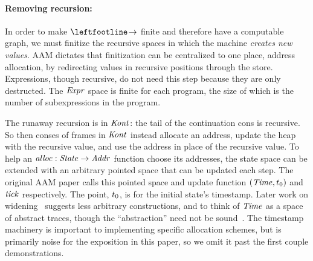 \paragraph{Removing recursion:}
In order to make $\stepto$ finite and therefore have a computable graph, we must finitize the recursive spaces in which the machine \emph{creates new values}.
%
AAM dictates that finitization can be centralized to one place, address allocation, by redirecting values in recursive positions through the store.
%
Expressions, though recursive, do not need this step because they are only destructed.
%
The $\mathit{Expr}$ space is finite for each program, the size of which is the number of subexpressions in the program.
%

%
The runaway recursion is in $\mathit{Kont}$: the tail of the continuation cons is recursive.
%
So then conses of frames in $\mathit{Kont}$ instead allocate an address, update the heap with the recursive value, and use the address in place of the recursive value.
%
To help an $\mathit{alloc} : \mathit{State} \to \mathit{Addr}$ function choose its addresses, the state space can be extended with an arbitrary pointed space that can be updated each step.
%
The original AAM paper calls this pointed space and update function $(\mathit{Time},t_0)$ and $\mathit{tick}$ respectively.
%
The point, $t_0$, is for the initial state's timestamp.
%
Later work on widening~\citep{dvanhorn:Hardekopf2014Widening} suggests less arbitrary constructions, and to think of $\mathit{Time}$ as a space of abstract traces, though the ``abstraction'' need not be sound~\citep{dvanhorn:Might2009Posteriori}.
%
The timestamp machinery is important to implementing specific allocation schemes, but is primarily noise for the exposition in this paper, so we omit it past the first couple demonstrations.





